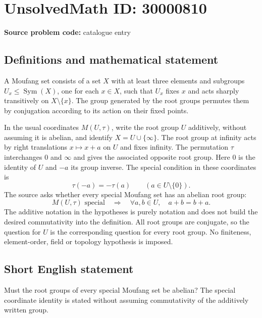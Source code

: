 \documentclass[11pt]{article}
\begin{document}
\section*{UnsolvedMath ID: 30000810}
\textbf{Source problem code:} catalogue entry
\subsection{Definitions and mathematical statement}
A Moufang set consists of a set $X$ with at least three elements and subgroups $U_x\leq\operatorname{Sym}(X)$, one for each $x\in X$, such that $U_x$ fixes $x$ and acts sharply transitively on $X\setminus\{x\}$. The group generated by the root groups permutes them by conjugation according to its action on their fixed points.

In the usual coordinates $M(U,\tau)$, write the root group $U$ additively, without assuming it is abelian, and identify $X=U\cup\{\infty\}$. The root group at infinity acts by right translations $x\mapsto x+a$ on $U$ and fixes infinity. The permutation $\tau$ interchanges $0$ and $\infty$ and gives the associated opposite root group. Here $0$ is the identity of $U$ and $-a$ its group inverse. The special condition in these coordinates is
\[
\tau(-a)=-\tau(a)\qquad(a\in U\setminus\{0\}).
\]
The source asks whether every special Moufang set has an abelian root group:
\[
M(U,\tau)\text{ special}\quad\Longrightarrow\quad
\forall a,b\in U,\quad a+b=b+a.
\]
The additive notation in the hypotheses is purely notation and does not build the desired commutativity into the definition. All root groups are conjugate, so the question for $U$ is the corresponding question for every root group. No finiteness, element-order, field or topology hypothesis is imposed.
\subsection{Short English statement}
Must the root groups of every special Moufang set be abelian? The special coordinate identity is stated without assuming commutativity of the additively written group.
\end{document}
